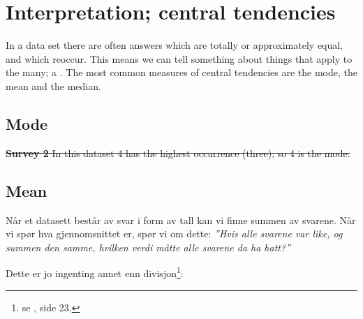 \section{Interpretation; central tendencies}
In a data set there are often answers which are totally or approximately equal, and which reoccur. This means we can tell something about things that apply to the many; a . The most common measures of central tendencies are the mode, the mean and the median.
\subsection{Mode}
 \regv
\st{
\textbf{Survey 2} \os
In this dataset 4 has the highest occurrence (three), so 4 is the mode.
} 
\newpage
\subsection{Mean}
Når et datasett består av svar i form av tall kan vi finne summen av svarene. Når vi spør hva gjennomsnittet er, spør vi om dette: \os
\textsl{''Hvis alle svarene var like, og summen den samme, hvilken verdi måtte alle svarene da ha hatt?''}\os

Dette er jo ingenting annet enn divisjon\footnote{se \mb, side 23.}: \regv

\reg[Gjennomsnitt]{ \vs
\[ \text{gjennomsnitt}=\frac{\text{summen av verdiene fra datasettet}}{\text{antall verdier}} \]
} \regv

